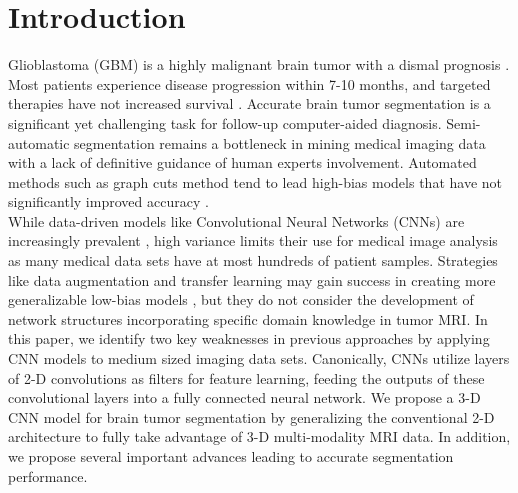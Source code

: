 \documentclass{llncs}
\begin{document}


\section{Introduction}
Glioblastoma (GBM) is a highly malignant brain tumor with a dismal prognosis \cite{Adamson09}. Most patients experience disease progression within 7-10 months, and targeted therapies have not increased survival \cite{Omuro13,Omuro07}. Accurate brain tumor segmentation is a significant yet challenging task for follow-up computer-aided diagnosis. Semi-automatic segmentation remains a bottleneck in mining medical imaging data with a lack of definitive guidance of human experts involvement. Automated methods such as graph cuts method tend to lead high-bias models that have not significantly improved accuracy \cite{Njeh15}. \\
%
%
\indent While data-driven models like Convolutional Neural Networks (CNNs) are increasingly prevalent \cite{Deng09,Krizhevsky12,Lawrence97,Wei}, high variance limits their use for medical image analysis as many medical data sets have at most hundreds of patient samples. Strategies like data augmentation and transfer learning may gain success in creating more generalizable low-bias models \cite{Cui14,Yosinski14}, but they do not consider the development of network structures incorporating specific domain knowledge in tumor MRI. In this paper, we identify two key weaknesses in previous approaches by applying CNN models to medium sized imaging data sets. Canonically, CNNs utilize layers of 2-D convolutions as filters for feature learning, feeding the outputs of these convolutional layers into a fully connected neural network. We propose a 3-D CNN model for brain tumor segmentation by generalizing the conventional 2-D architecture to fully take advantage of 3-D multi-modality MRI data. In addition, we propose several important advances leading to accurate segmentation performance. \\ 
\end{document}
